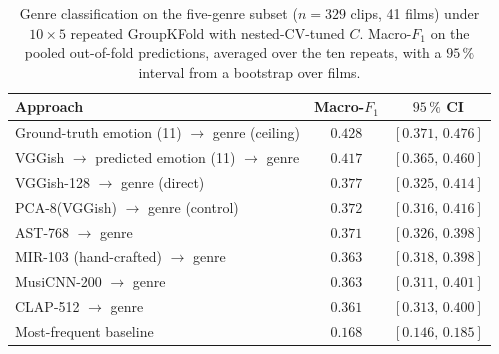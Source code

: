 \begin{table}[t]
  \centering
  \caption{Genre classification on the five-genre subset ($n=329$ clips, 41 films)
    under $10\times5$ repeated GroupKFold with nested-CV-tuned $C$. Macro-$F_1$ on the
    pooled out-of-fold predictions, averaged over the ten repeats, with a $95\,\%$
    interval from a bootstrap over films.}
  \label{tab:power_arms}
  \begin{tabular}{lcc}
    \hline
    Approach & Macro-$F_1$ & $95\,\%$ CI \\
    \hline
    Ground-truth emotion (11) $\rightarrow$ genre (ceiling)         & $0.428$ & $[0.371,\,0.476]$ \\
    VGGish $\rightarrow$ predicted emotion (11) $\rightarrow$ genre & $0.417$ & $[0.365,\,0.460]$ \\
    VGGish-128 $\rightarrow$ genre (direct)                         & $0.377$ & $[0.325,\,0.414]$ \\
    PCA-8(VGGish) $\rightarrow$ genre (control)                     & $0.372$ & $[0.316,\,0.416]$ \\
    AST-768 $\rightarrow$ genre                                     & $0.371$ & $[0.326,\,0.398]$ \\
    MIR-103 (hand-crafted) $\rightarrow$ genre                      & $0.363$ & $[0.318,\,0.398]$ \\
    MusiCNN-200 $\rightarrow$ genre                                 & $0.363$ & $[0.311,\,0.401]$ \\
    CLAP-512 $\rightarrow$ genre                                    & $0.361$ & $[0.313,\,0.400]$ \\
    Most-frequent baseline                                          & $0.168$ & $[0.146,\,0.185]$ \\
    \hline
  \end{tabular}
\end{table}

